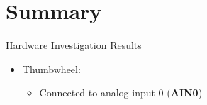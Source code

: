 \section{Summary}

\begin{frame}
	{Hardware Investigation Results}
	\begin{itemize}
		\item
			Thumbwheel:
		\begin{itemize}
		\item
			Connected to analog input 0 (\textbf{AIN0})
		\end{itemize}
	\end{itemize}
\end{frame}


